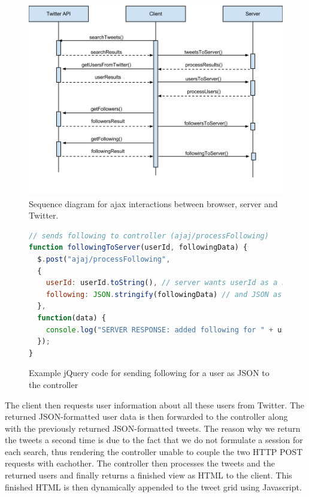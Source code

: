 \begin{figure}[ht]
    \begin{minipage}[b]{1\linewidth}
        \centering
        \includegraphics[width=1\textwidth]{figures/sequencediagram}
        \caption{Sequence diagram for ajax interactions between browser, server and Twitter.}
        \label{fig:AjaxInteractions}
    \end{minipage}
\end{figure}

\begin{figure}[h!]
\begin{lstlisting}[language=javascript]
// sends following to controller (ajaj/processFollowing)
function followingToServer(userId, followingData) {
  $.post("ajaj/processFollowing", 
  { 
    userId: userId.toString(), // server wants userId as a string
    following: JSON.stringify(followingData) // and JSON as a string
  },
  function(data) {
    console.log("SERVER RESPONSE: added following for " + userId);
  });
}
\end{lstlisting}
\caption{Example jQuery code for sending following for a user as JSON to the controller}
\label{ajaxRequest}
\end{figure}

The client then requests user information about all these users from Twitter. The returned JSON-formatted user data is then forwarded to the controller along with the previously returned JSON-formatted tweets. The reason why we return the tweets a second time is due to the fact that we do not formulate a session for each search, thus rendering the controller unable to couple the two HTTP POST requests with eachother. The controller then processes the tweets and the returned users and finally returns a finished view as HTML to the client. This finished HTML is then dynamically appended to the tweet grid using Javascript.

